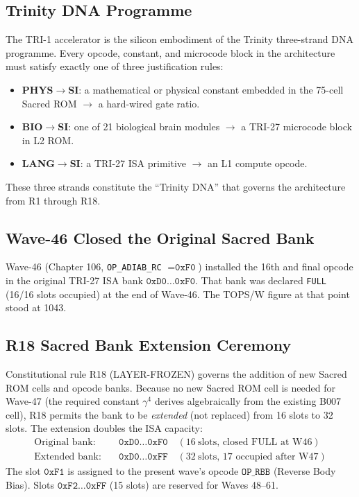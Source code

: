 \subsection{Trinity DNA Programme}

The TRI-1 accelerator is the silicon embodiment of the Trinity
three-strand DNA programme.  Every opcode, constant, and microcode block in
the architecture must satisfy exactly one of three justification rules:
\begin{itemize}
\item \textbf{PHYS$\to$SI}: a mathematical or physical constant embedded in the
  75-cell Sacred ROM $\to$ a hard-wired gate ratio.
\item \textbf{BIO$\to$SI}: one of 21 biological brain modules $\to$ a TRI-27
  microcode block in L2 ROM.
\item \textbf{LANG$\to$SI}: a TRI-27 ISA primitive $\to$ an L1 compute opcode.
\end{itemize}
These three strands constitute the ``Trinity DNA'' that governs the
architecture from R1 through R18.

\subsection{Wave-46 Closed the Original Sacred Bank}

Wave-46 (Chapter 106, \texttt{OP\_ADIAB\_RC} $= \texttt{0xF0}$) installed the
16th and final opcode in the original TRI-27 ISA bank
$\texttt{0xD0}\ldots\texttt{0xF0}$.
That bank was declared \texttt{FULL} (16/16 slots occupied) at the end of
Wave-46.
The TOPS/W figure at that point stood at 1043.

\subsection{R18 Sacred Bank Extension Ceremony}

Constitutional rule R18 (\textsc{LAYER-FROZEN}) governs the addition of new
Sacred ROM cells and opcode banks.
Because no new Sacred ROM cell is needed for Wave-47 (the required constant
$\gamma^{4}$ derives algebraically from the existing B007 cell), R18 permits
the bank to be \emph{extended} (not replaced) from 16 slots to 32 slots.
The extension doubles the ISA capacity:
\begin{align}
  \text{Original bank:} & \quad \texttt{0xD0}\ldots\texttt{0xF0}
    \quad (16\ \text{slots, closed FULL at W46})  \\
  \text{Extended bank:} & \quad \texttt{0xD0}\ldots\texttt{0xFF}
    \quad (32\ \text{slots, 17 occupied after W47})
\end{align}
The slot $\texttt{0xF1}$ is assigned to the present wave's opcode
$\texttt{OP\_RBB}$ (Reverse Body Bias).
Slots $\texttt{0xF2}\ldots\texttt{0xFF}$ (15 slots) are reserved for
Waves 48--61.

